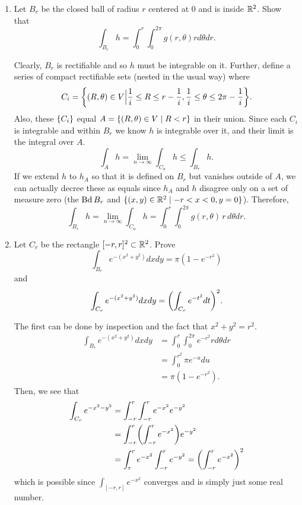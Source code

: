\documentclass{article}
\begin{document}
\begin{enumerate}[start=1,label={(\alph*)}]
  \item Let $B_{r}$ be the closed ball of radius $r$ centered at 0 and is inside $\RR[2]$. Show that
        \[ \int_{B_{r}}h = \int_{0}^{r}\int_{0}^{2\pi} g(r, \theta) r d\theta dr. \]

        Clearly, $B_{r}$ is rectifiable and so $h$ must be integrable on it.
        Further, define a series of compact rectifiable sets (nested in the usual way) where
        \[ C_{i} = \set*{ (R, \theta) \in V \Big| \frac{1}{i} \le R \le r - \frac{1}{i}, \frac{1}{i} \le \theta \le 2\pi - \frac{1}{i} }. \]
        Also, these $\set{C_{i}}$ equal $A = \set{ (R, \theta) \in V \mid R < r }$ in their union.
        Since each $C_{i}$ is integrable and within $B_{r}$ we know $h$ is integrable over it, and their limit is the integral over $A$.
        \[ \int_{A} h = \lim_{n \to \infty}\int_{C_{n}}h \le \int_{B_{r}}h. \]
        If we extend $h$ to $h_{A}$ so that it is defined on $B_{r}$ but vanishes outside of $A$, we can actually decree these as equals
        since $h_{A}$ and $h$ disagree only on a set of measure zero (the $\Bd B_{r}$ and $\set{(x, y) \in \RR[2] \mid -r < x < 0, y = 0}$).
        Therefore,
        \[ \int_{B_{r}}h = \lim_{n \to \infty}\int_{C_{n}}h = \int_{0}^{r}\int_{0}^{2\pi}g(r, \theta)\, r\, d\theta dr. \]

  \item Let $C_{r}$ be the rectangle $\bracks{-r, r}^{2} \subset \RR[2]$. Prove
        \[ \int_{B_{r}}\! e^{-(x^{2} + y^{2})} dx dy = \pi(1 - e^{-r^{2}}) \] and \[ \int_{C_{r}}e^{-(x^{2} + y^{2})} dx dy = \pars*{\int_{C_{r}} e^{-t^{2}} dt}^{2}. \]

        The first can be done by inspection and the fact that $x^{2} + y^{2} = r^{2}$.
          \begin{align*}
            \int_{B_{r}}\! e^{-(x^{2} + y^{2})} dx dy &= \int_{0}^{r}\int_{0}^{2\pi} e^{-r^{2}} r d\theta dr\\
            &= \int_{0}^{r^{2}} \pi e^{-u} du\\
            &= \pi(1 - e^{-r^{2}}).
        \end{align*}
        Then, we see that
        \begin{align*}
          \int_{C_{r}} e^{-x^{2}-y^{2}} &= \int_{-r}^{r}\int_{-r}^{r}e^{-x^{2}}e^{-y^{2}}\\
          &= \int_{-r}^{r}\pars*{\int_{-r}^{r}e^{-x^{2}}}e^{-y^{2}}\\
          &= \int_{r}^{r}e^{-x^{2}}\int_{-r}^{r}e^{-y^{2}} = \pars*{\int_{-r}^{r}e^{-x^{2}}}^{2}
        \end{align*}
        which is possible since $\int_{[-r, r]}e^{-x^{2}}$ converges and is simply just some real number.


\end{enumerate}
\end{document}
